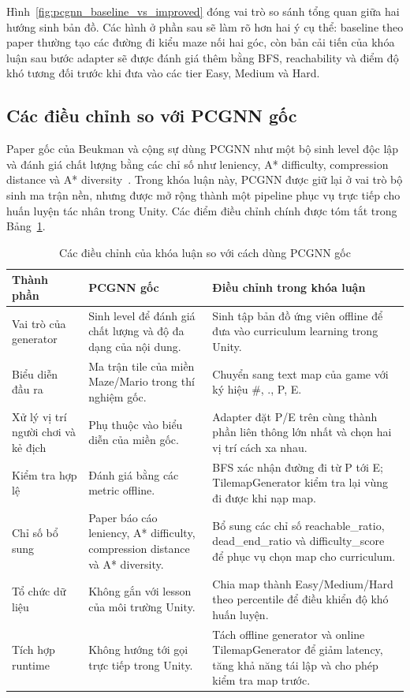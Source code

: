 Hình~\ref{fig:pcgnn_baseline_vs_improved} đóng vai trò so sánh tổng quan giữa hai hướng sinh bản đồ. Các hình ở phần sau sẽ làm rõ hơn hai ý cụ thể: baseline theo paper thường tạo các đường đi kiểu maze nối hai góc, còn bản cải tiến của khóa luận sau bước adapter sẽ được đánh giá thêm bằng BFS, reachability và điểm độ khó tương đối trước khi đưa vào các tier Easy, Medium và Hard.

\subsection{Các điều chỉnh so với PCGNN gốc}

Paper gốc của Beukman và cộng sự dùng PCGNN như một bộ sinh level độc lập và đánh giá chất lượng bằng các chỉ số như leniency, A* difficulty, compression distance và A* diversity~\cite{Beukman2022}. Trong khóa luận này, PCGNN được giữ lại ở vai trò bộ sinh ma trận nền, nhưng được mở rộng thành một pipeline phục vụ trực tiếp cho huấn luyện tác nhân trong Unity. Các điểm điều chỉnh chính được tóm tắt trong Bảng~\ref{tab:pcgnn_improvements}.

\begin{table}[H]
    \centering
    \small
    \caption{Các điều chỉnh của khóa luận so với cách dùng PCGNN gốc}
    \label{tab:pcgnn_improvements}
    \begin{tabular}{p{4.0cm} p{5.0cm} p{5.0cm}}
        \toprule
        \textbf{Thành phần} & \textbf{PCGNN gốc} & \textbf{Điều chỉnh trong khóa luận} \\
        \midrule
        Vai trò của generator & Sinh level để đánh giá chất lượng và độ đa dạng của nội dung. & Sinh tập bản đồ ứng viên offline để đưa vào curriculum learning trong Unity. \\
        Biểu diễn đầu ra & Ma trận tile của miền Maze/Mario trong thí nghiệm gốc. & Chuyển sang text map của game với ký hiệu \#, ., P, E. \\
        Xử lý vị trí người chơi và kẻ địch & Phụ thuộc vào biểu diễn của miền gốc. & Adapter đặt P/E trên cùng thành phần liên thông lớn nhất và chọn hai vị trí cách xa nhau. \\
        Kiểm tra hợp lệ & Đánh giá bằng các metric offline. & BFS xác nhận đường đi từ P tới E; TilemapGenerator kiểm tra lại vùng đi được khi nạp map. \\
        Chỉ số bổ sung & Paper báo cáo leniency, A* difficulty, compression distance và A* diversity. & Bổ sung các chỉ số reachable\_ratio, dead\_end\_ratio và difficulty\_score để phục vụ chọn map cho curriculum. \\
        Tổ chức dữ liệu & Không gắn với lesson của môi trường Unity. & Chia map thành Easy/Medium/Hard theo percentile để điều khiển độ khó huấn luyện. \\
        Tích hợp runtime & Không hướng tới gọi trực tiếp trong Unity. & Tách offline generator và online TilemapGenerator để giảm latency, tăng khả năng tái lập và cho phép kiểm tra map trước. \\
        \bottomrule
    \end{tabular}
\end{table}

